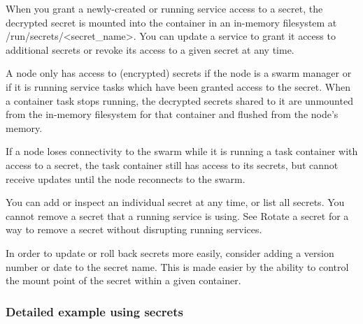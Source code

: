 When you grant a newly-created or running service access to a secret, the
decrypted secret is mounted into the container in an in-memory filesystem
at /run/secrets/<secret\_name>. You can update a service to grant it access
to additional secrets or revoke its access to a given secret at any time.

A node only has access to (encrypted) secrets if the node is a swarm
manager or if it is running service tasks which have been granted access to
the secret. When a container task stops running, the decrypted secrets
shared to it are unmounted from the in-memory filesystem for that container
and flushed from the node’s memory.

If a node loses connectivity to the swarm while it is running a task
container with access to a secret, the task container still has access to
its secrets, but cannot receive updates until the node reconnects to the
swarm.

You can add or inspect an individual secret at any time, or list all
secrets. You cannot remove a secret that a running service is using. See
Rotate a secret for a way to remove a secret without disrupting running
services.

In order to update or roll back secrets more easily, consider adding a
version number or date to the secret name. This is made easier by the
ability to control the mount point of the secret within a given container.

\subsubsection{Detailed example using secrets}


